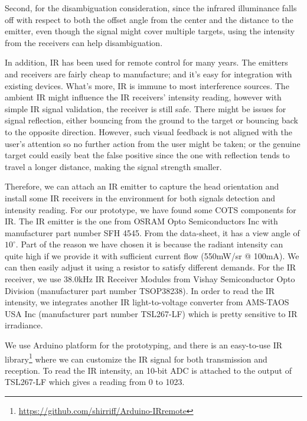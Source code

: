 Second, for the disambiguation consideration, since the infrared illuminance falls off with respect to both the offset angle from the center and the distance to the emitter, even though the signal might cover multiple targets, using the intensity from the receivers can help disambiguation.  

In addition, IR has been used for remote control for many years. The emitters and receivers are fairly cheap to manufacture; and it's easy for integration with existing devices. 
What's more, IR is immune to most interference sources. The ambient IR might influence the IR receivers' intensity reading, however with simple IR signal validation, the receiver is still safe. There might be issues for signal reflection, either bouncing from the ground to the target or bouncing back to the opposite direction. However, such visual feedback is not aligned with the user's attention so no further action from the user might be taken; or the genuine target could easily beat the false positive since the one with reflection tends to travel a longer distance, making the signal strength smaller.

Therefore, we can attach an IR emitter to capture the head orientation and install some IR receivers in the environment for both signals detection and intensity reading. For our prototype, we have found some COTS components for IR. 
The IR emitter is the one from OSRAM Opto Semiconductors Inc with manufacturer part number SFH 4545. From the data-sheet, it has a view angle of $10^\circ$. Part of the reason we have chosen it is because the radiant intensity can quite high if we provide it with sufficient current flow (550mW/sr @ 100mA). We can then easily adjust it using a resistor to satisfy different demands. 
For the IR receiver, we use 38.0kHz IR Receiver Modules from Vishay Semiconductor Opto Division (manufacturer part number TSOP38238). 
In order to read the IR intensity, we integrates another IR light-to-voltage converter from AMS-TAOS USA Inc (manufacturer part number TSL267-LF) which is pretty sensitive to IR irradiance. 

We use Arduino platform for the prototyping, and there is an easy-to-use IR library\footnote{\url{https://github.com/shirriff/Arduino-IRremote}} where we can customize the IR signal for both transmission and reception. To read the IR intensity, an 10-bit ADC is attached to the output of TSL267-LF which gives a reading from 0 to 1023. 

